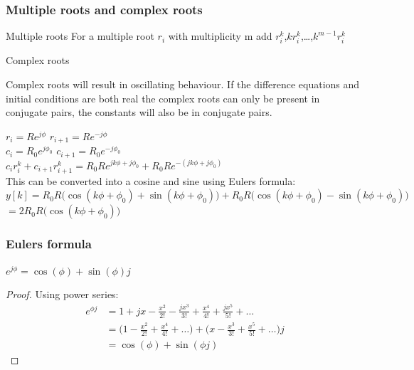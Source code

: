 \begin{frame}
	\frametitle{Multiple roots and complex roots}
	\begin{block}{Multiple roots}
		\scriptsize{For a multiple root $r_i$ with multiplicity m add $r_i^k$,$kr_i^k$,\dots,$k^{m-1}r_i^{k}$}
	\end{block}
	\begin{block}{Complex roots}
		\scriptsize{
		Complex roots will result in oscillating behaviour.
		If the difference equations and initial conditions are both real the complex roots can only be present in conjugate pairs, the constants will also be in conjugate pairs.
		\begin{center}
				$ r_i = Re^{j\phi}$ \quad	$r_{i+1} = Re^{-j\phi}$\\
				$c_i = R_0e^{j\phi_0}$ \quad	 $c_{i+1} = R_0e^{-j\phi_0}$\\
				$c_ir_i^k+c_{i+1}r_{i+1}^k = R_0Re^{jk\phi+j\phi_0} +  R_0Re^{-(jk\phi+j\phi_0)} $\\
				This can be converted into a cosine and sine using Eulers formula:	
				$y[k] = R_0R\big(\cos(k\phi+\phi_0) + \sin(k\phi+\phi_0) \big) + R_0R\big(\cos(k\phi+\phi_0) - \sin(k\phi+\phi_0) \big)$ \\
						 $= 2R_0R\big(\cos(k\phi+\phi_0)\big)$			
		\end{center}}
	\end{block}
\end{frame}
\begin{frame}
	\frametitle{Eulers formula}
	\begin{theorem}
		$e^{j\phi} = \cos(\phi) + \sin(\phi)j$
	\end{theorem}
	\begin{proof}
		Using power series:
		\begin{equation*}
				\begin{split}
				e^{\phi j} &= 1 + jx-\frac{x^{2}}{2!} - \frac{jx^{3}}{3!} + \frac{x^{4}}{4!} + \frac{jx^{5}}{5!} + \dots\\
				& = \bigg(1-\frac{x^{2}}{2!}+ \frac{x^{4}}{4!} + \dots\bigg)+\bigg(x - \frac{x^{3}}{3!} + \frac{x^{5}}{5!}+\dots\bigg)j\\
				&= \cos(\phi) + \sin(\phi j)
				\end{split}	
		\end{equation*}	
	\end{proof}
\end{frame}
